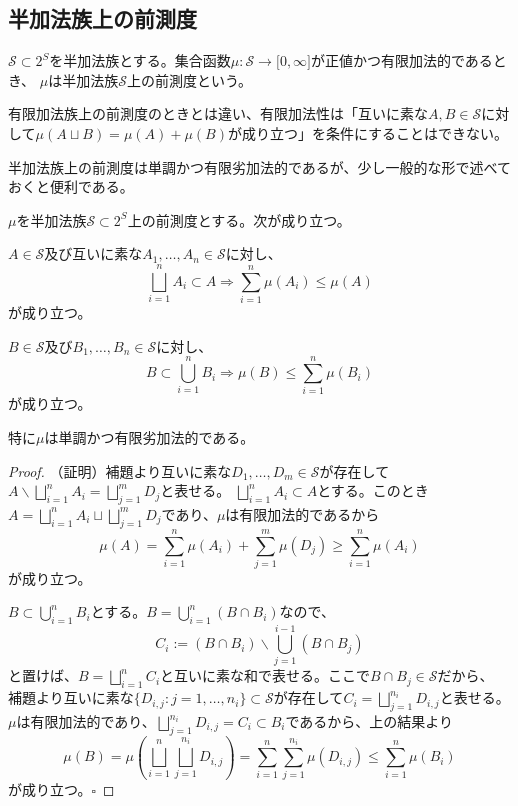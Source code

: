 \documentclass[../root.tex]{subfiles}
\begin{document}
\subsection{半加法族上の前測度}
\begin{Def}{}{}
$ \mathscr{S}\subset 2^{S} $を半加法族とする。集合函数$ \mu\colon\mathscr{S}\rightarrow\lbrack 0, \infty \rbrack $が正値かつ有限加法的であるとき、
$ \mu $は半加法族$ \mathscr{S} $上の前測度という。
\end{Def}

有限加法族上の前測度のときとは違い、有限加法性は「互いに素な$ A, B\in\mathscr{S} $に対して$ \mu( A\sqcup B )=\mu( A )+\mu( B ) $が成り立つ」を条件にすることはできない。

半加法族上の前測度は単調かつ有限劣加法的であるが、少し一般的な形で述べておくと便利である。

\begin{Prop}{}{}
$ \mu $を半加法族$ \mathscr{S}\subset 2^{S} $上の前測度とする。次が成り立つ。
\begin{EnumCond}
\item $ A\in\mathscr{S} $及び互いに素な$ A_{1}, \dotsc, A_{n}\in\mathscr{S} $に対し、
\[ \bigsqcup_{i=1}^{n}A_{i}\subset A \Rightarrow \sum_{i=1}^{n}\mu( A_{i} )\le\mu( A ) \]
が成り立つ。
\item $ B\in\mathscr{S} $及び$ B_{1}, \dotsc, B_{n}\in\mathscr{S} $に対し、
\[ B\subset\bigcup_{i=1}^{n}B_{i} \Rightarrow \mu( B ) \le\sum_{i=1}^{n}\mu( B_{i} ) \]
が成り立つ。
\end{EnumCond}

特に$ \mu $は単調かつ有限劣加法的である。
\end{Prop}

\begin{proof}
（証明）補題より互いに素な$ D_{1}, \dotsc, D_{m}\in\mathscr{S} $が存在して$ A\backslash\bigsqcup_{i=1}^{n}A_{i}=\bigsqcup_{j=1}^{m}D_{j} $と表せる。
$ \bigsqcup_{i=1}^{n}A_{i}\subset A $とする。このとき$ A=\bigsqcup_{i=1}^{n}A_{i}\sqcup\bigsqcup_{j=1}^{m}D_{j} $であり、$ \mu $は有限加法的であるから
\[ \mu( A )=\sum_{i=1}^{n}\mu( A_{i} )+\sum_{j=1}^{m}\mu( D_{j} )\ge\sum_{i=1}^{n}\mu( A_{i} ) \]
が成り立つ。

$ B\subset\bigcup_{i=1}^{n}B_{i} $とする。$ B=\bigcup_{i=1}^{n}( B\cap B_{i} ) $なので、
\[ C_{i}:=( B\cap B_{i} )\backslash\bigcup_{j=1}^{i-1}( B\cap B_{j} ) \]
と置けば、$ B=\bigsqcup_{i=1}^{n}C_{i} $と互いに素な和で表せる。ここで$ B\cap B_{j}\in\mathscr{S} $だから、
補題より互いに素な$ \lbrace D_{i, j} : j=1, \dotsc, n_{i} \rbrace\subset\mathscr{S} $が存在して$ C_{i}=\bigsqcup_{j=1}^{n_{i}}D_{i, j} $と表せる。
$ \mu $は有限加法的であり、$ \bigsqcup_{j=1}^{n_{i}}D_{i, j}=C_{i}\subset B_{i} $であるから、上の結果より
\[ \mu( B )=\mu\left( \bigsqcup_{i=1}^{n}\bigsqcup_{j=1}^{n_{i}}D_{i, j} \right)=\sum_{i=1}^{n}\sum_{j=1}^{n_{i}}\mu( D_{i, j} )\le\sum_{i=1}^{n}\mu( B_{i} ) \]
が成り立つ。$ \square $
\end{proof}
\end{document}

